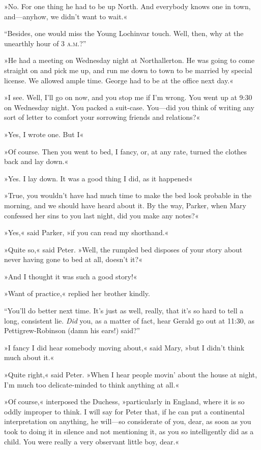 »No. For one thing he had to be up North. And everybody knows one in town, and\allowbreak---\allowbreak anyhow, we didn't want to wait.«

\enquote{Besides, one would miss the Young Lochinvar touch. Well, then, why at the unearthly hour of 3 \textsc{a.m.}?}

»He had a meeting on Wednesday night at Northallerton. He was going to come straight on and pick me up, and run me down to town to be married by special license. We allowed ample time. George had to be at the office next day.«

»I see. Well, I'll go on now, and you stop me if I'm wrong. You went up at 9:30 on Wednesday night. You packed a suit-case. You\allowbreak---\allowbreak did you think of writing any sort of letter to comfort your sorrowing friends and relations?«

»Yes, I wrote one. But I\longdash«

»Of course. Then you went to bed, I fancy, or, at any rate, turned the clothes back and lay down.«

»Yes. I lay down. It was a good thing I did, as it happened\longdash«

»True, you wouldn't have had much time to make the bed look probable in the morning, and we should have heard about it. By the way, Parker, when Mary confessed her sins to you last night, did you make any notes?«

»Yes,« said Parker, »if you can read my shorthand.«

»Quite so,« said Peter. »Well, the rumpled bed disposes of your story about never having gone to bed at all, doesn't it?«

»And I thought it was such a good story!«

»Want of practice,« replied her brother kindly.

\enquote{You'll do better next time. It's just as well, really, that it's so hard to tell a long, consistent lie. \textit{Did} you, as a matter of fact, hear Gerald go out at 11:30, as Pettigrew-Robinson (damn his ears!) said?}

»I fancy I did hear somebody moving about,« said Mary, »but I didn't think much about it.«

»Quite right,« said Peter. »When I hear people movin' about the house at night, I'm much too delicate-minded to think anything at all.«

»Of course,« interposed the Duchess, »particularly in England, where it is so oddly improper to think. I will say for Peter that, if he can put a continental interpretation on anything, he will\allowbreak---\allowbreak so considerate of you, dear, as soon as you took to doing it in silence and not mentioning it, as you so intelligently did as a child. You were really a very observant little boy, dear.«

